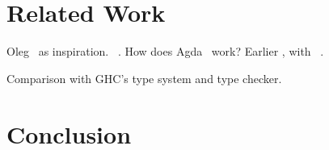 \section{Related Work}

Oleg~\cite{McBride1999} as inspiration. \Epigram{}~\cite{McBride2004a}.
How does Agda~\cite{norell2007thesis} work?
Earlier \Idris{}, with \Ivor{}~\cite{Brady2006b}.

Comparison with GHC's type system and type checker.

\section{Conclusion}
